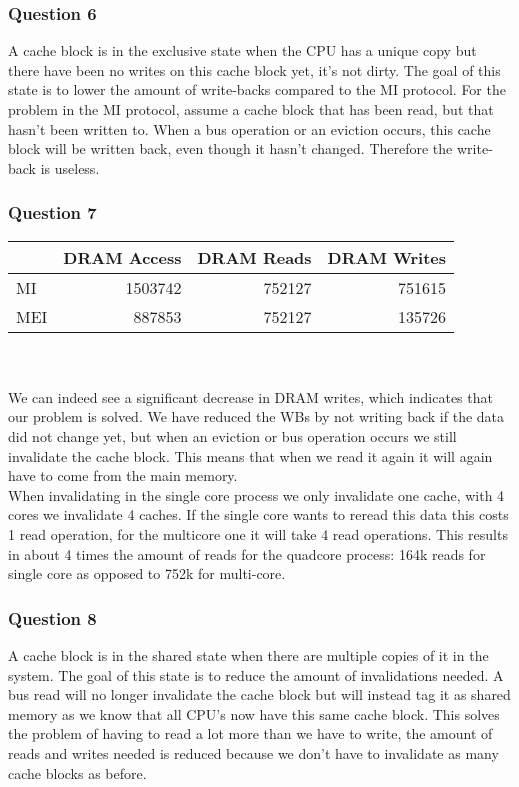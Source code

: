 \documentclass[12pt,a4paper,oneside]{article}
\begin{document}
\subsubsection*{Question 6}
A cache block is in the exclusive state when the CPU has a unique copy but there have been no writes on this cache block yet, it's not dirty. The goal of this state is to lower the amount of write-backs compared to the MI protocol.
For the problem in the MI protocol, assume a cache block that has been read, but that hasn't been written to. When a bus operation or an eviction occurs, this cache block will be written back, even though it hasn't changed. Therefore the write-back is useless.

\subsubsection*{Question 7}
\begin{tabular}{| l | r | r | r |}
\hline
&DRAM Access & DRAM Reads & DRAM Writes\\
\hline
MI & 1503742 & 752127 & 751615\\
\hline
MEI &  887853& 752127 & 135726\\
\hline
\end{tabular}\\\\
We can indeed see a significant decrease in DRAM writes, which indicates that our problem is solved. We have reduced the WBs by not writing back if the data did not change yet, but when an eviction or bus operation occurs we still invalidate the cache block. This means that when we read it again it will again have to come from the main memory. \\
When invalidating in the single core process we only invalidate one cache, with 4 cores we invalidate 4 caches. If the single core wants to reread this data this costs 1 read operation, for the multicore one it will take 4 read operations. This results in about 4 times the amount of reads for the quadcore process: 164k reads for single core as opposed to 752k for multi-core.

\subsubsection*{Question 8}
A cache block is in the shared state when there are multiple copies of it in the system. The goal of this state is to reduce the amount of invalidations needed. A bus read will no longer invalidate the cache block but will instead tag it as shared memory as we know that all CPU's now have
this same cache block. This solves the problem of having to read a lot more than we have to write, the amount of reads and writes needed is reduced because we don't have to invalidate as many cache blocks as before.
\end{document}
